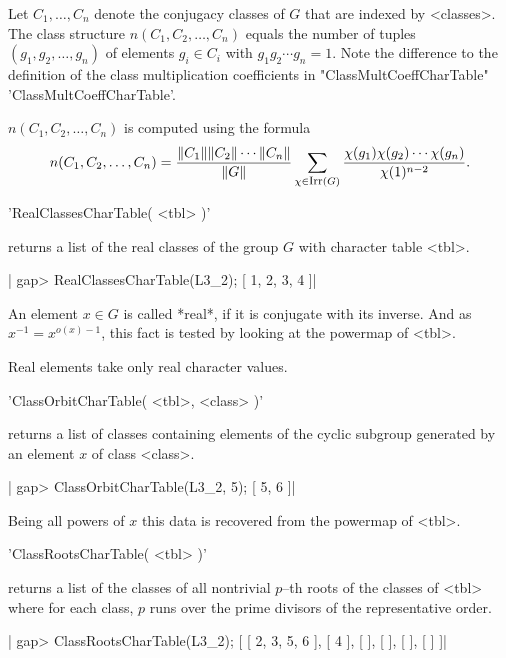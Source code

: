 Let $C_1, \dots, C_n$ denote the conjugacy classes of $G$ that are
indexed by <classes>.  The class structure $n(C_1, C_2, \ldots, C_n)$
equals the number of tuples $(g_1, g_2, \ldots, g_n)$ of elements
$g_i\in C_i$ with $g_1 g_2 \cdots g_n = 1$.  Note the difference to the
definition of the class multiplication coefficients in
"ClassMultCoeffCharTable" 'ClassMultCoeffCharTable'.

$n(C_1, C_2, \ldots, C_n)$ is computed using the formula
\[ n(C_1, C_2, \ldots, C_n) = \frac{\|C_1\|\|C_2\|\cdots\|C_n\|}{\|G\|}
             \sum_{\chi \in \mbox{\footnotesize Irr}(G)}
             \frac{\chi(g_1)\chi(g_2)\cdots\chi(g_n)}{\chi(1)^{n-2}} . \]

%

'RealClassesCharTable( <tbl> )'

returns a list of the real classes of the group $G$ with character table
<tbl>.

|    gap> RealClassesCharTable(L3_2);
    [ 1, 2, 3, 4 ]|

An element $x \in G$ is called *real*, if it is conjugate with its
inverse. And as $x^{-1} = x^{o(x)-1}$, this fact is tested by looking
at the powermap of <tbl>.

Real elements take only real character values.


%

'ClassOrbitCharTable( <tbl>, <class> )'

returns a list of classes containing elements of
the cyclic subgroup generated by an element $x$ of class <class>.

|    gap> ClassOrbitCharTable(L3_2, 5);
    [ 5, 6 ]|

Being all powers of $x$ this data is recovered from the powermap
of <tbl>.

%

'ClassRootsCharTable( <tbl> )'

returns a list of the classes of all nontrivial $p$--th roots of the
classes of <tbl> where for each class, $p$ runs over the prime divisors
of the representative order.

|    gap> ClassRootsCharTable(L3_2);
    [ [ 2, 3, 5, 6 ], [ 4 ], [  ], [  ], [  ], [  ] ]|

